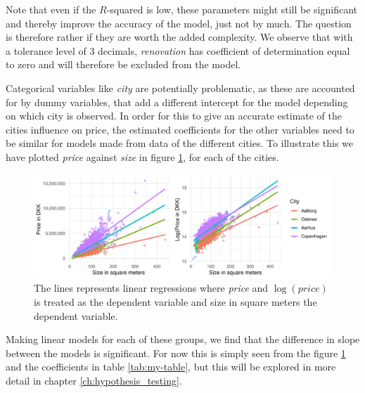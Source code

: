 Note that even if the $R$-squared is low, these parameters might still be significant and thereby improve the accuracy of the model, just not by much. 
The question is therefore rather if they are worth the added complexity.
We observe that with a tolerance level of 3 decimals, \textit{renovation} has coefficient of determination equal to zero and will therefore be excluded from the model.

Categorical variables like \textit{city} are potentially problematic, as these are accounted for by dummy variables, that add a different intercept for the model depending on which city is observed.
In order for this to give an accurate estimate of the cities influence on price, the estimated coefficients for the other variables need to be similar for models made from data of the different cities. 
To illustrate this we have plotted \textit{price} against \textit{size} in figure \ref{fig:Forskellig_haeldning}, for each of the cities.
\begin{figure}[H]
    \centering
    \includegraphics[width = 1\textwidth]{figures/Nanna/Forskellig_haeldning.pdf}
    \caption{The lines represents linear regressions where \textit{price} and $\log(price)$ is treated as the dependent variable and size in square meters the dependent variable.}
    \label{fig:Forskellig_haeldning}
\end{figure}
Making linear models for each of these groups, we find that the difference in slope between the models is significant.
For now this is simply seen from the figure \ref{fig:Forskellig_haeldning} and the coefficients in table \ref{tab:my-table}, but this will be explored in more detail in chapter \ref{ch:hypothesis_testing}. 


